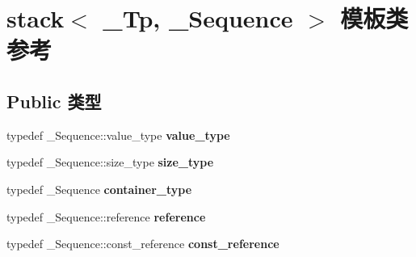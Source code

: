 \hypertarget{classstack}{}\section{stack$<$ \+\_\+\+Tp, \+\_\+\+Sequence $>$ 模板类 参考}
\label{classstack}
\subsection*{Public 类型}
\begin{DoxyCompactItemize}
\item 
\mbox{\label{classstack_a6f483c42b4c7dc90453237feaf4e9453}} 
typedef \+\_\+\+Sequence\+::value\+\_\+type {\bfseries value\+\_\+type}
\item 
\mbox{\label{classstack_aee9f74fe3e28b0d9b6ac7ff5845363ac}} 
typedef \+\_\+\+Sequence\+::size\+\_\+type {\bfseries size\+\_\+type}
\item 
\mbox{\label{classstack_a32869706a88bbfcdf2e71f78779a1d5b}} 
typedef \+\_\+\+Sequence {\bfseries container\+\_\+type}
\item 
\mbox{\label{classstack_a4d989be18d84a99038c5f8a92c8fb338}} 
typedef \+\_\+\+Sequence\+::reference {\bfseries reference}
\item 
\mbox{\label{classstack_ad690d4cc96a2c2ea555c9ae3ba35d25a}} 
typedef \+\_\+\+Sequence\+::const\+\_\+reference {\bfseries const\+\_\+reference}
\end{DoxyCompactItemize}
